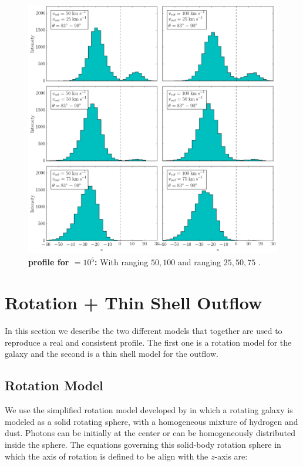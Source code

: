 \begin{figure}[h!]
	\begin{center}
		\includegraphics[width=1\textwidth]{./figures/chapter3/2_tau10E7_phi83-90}
	\end{center}
	\caption{\textbf{\lya profile for \tauh$=10^5$:} With \vrot ranging $50,100$ \kms and \vout ranging $25,50,75$ \kms.
		\label{fig:2_tau10E7_phi83-90}}
\end{figure}

\newpage 
 
\chapter{Rotation + Thin Shell Outflow}

In this section we describe the two different models that together are used to reproduce a real and consistent \lya profile. The first one is a rotation model for the galaxy and the second is a thin shell model for the outflow. \\ 

\section{Rotation Model}

We use the simplified rotation model developed by \cite{Garavito14} in which a rotating galaxy is modeled as a solid rotating sphere, with a homogeneous mixture of hydrogen and dust. Photons can be initially at the center or can be homogeneously distributed inside the sphere. The equations governing this solid-body rotation sphere in
which the axis of rotation is defined to be align with the $z$-axis are: \\

